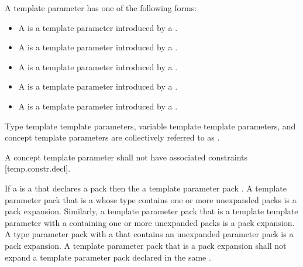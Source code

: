 \documentclass{wg21}
\begin{document}
\begin{addedblock}

\pnum
A template parameter has one of the following forms:
\begin{itemize}
\item A  is a template parameter introduced by a .
\item A  is a template parameter introduced by a .
\item A  is a template parameter introduced by a .
\item A  is a template parameter introduced by a .
\item A  is a template parameter introduced by a .
\end{itemize}
Type template template parameters, variable template template parameters, and concept template parameters are collectively referred to as .

A concept template parameter shall not have associated constraints [temp.constr.decl].

\end{addedblock}


\pnum
If a  is a
 that declares a
pack 
then the 
 a template parameter pack .
A template parameter pack that is a  whose type
contains one or more unexpanded packs is a pack expansion. Similarly,
a template parameter pack that is a template template parameter with a
 containing one or more unexpanded
packs is a pack expansion.
A type parameter pack with a  that
contains an unexpanded parameter pack is a pack expansion.
A template parameter pack that is a pack
expansion shall not expand a template parameter pack declared in the same
.
\end{document}
